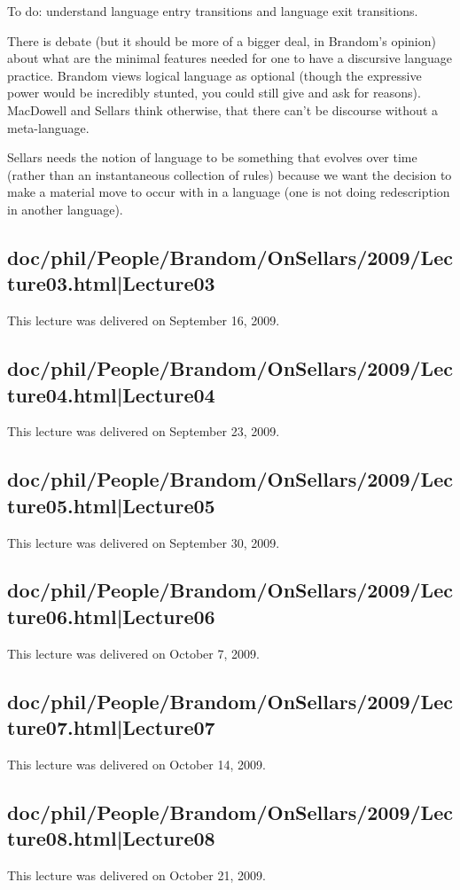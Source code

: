 \documentclass[12pt,a4paper]{report}
\begin{document}
To do: understand language entry transitions and language exit transitions.

There is debate (but it should be more of a bigger deal, in Brandom's opinion) about what are the minimal features needed for one to have a discursive language practice. Brandom views logical language as optional (though the expressive power would be incredibly stunted, you could still give and ask for reasons). MacDowell and Sellars think otherwise, that there can't be discourse without a meta-language.

Sellars needs the notion of language to be something that evolves over time (rather than an instantaneous collection of rules) because we want the decision to make a material move to occur with in a language (one is not doing redescription in another language).
\subsection{doc/phil/People/Brandom/OnSellars/2009/Lecture03.html|Lecture03}
This lecture was delivered on September 16, 2009.

\subsection{doc/phil/People/Brandom/OnSellars/2009/Lecture04.html|Lecture04}
This lecture was delivered on September 23, 2009.

\subsection{doc/phil/People/Brandom/OnSellars/2009/Lecture05.html|Lecture05}
This lecture was delivered on September 30, 2009.

\subsection{doc/phil/People/Brandom/OnSellars/2009/Lecture06.html|Lecture06}
This lecture was delivered on October 7, 2009.

\subsection{doc/phil/People/Brandom/OnSellars/2009/Lecture07.html|Lecture07}
This lecture was delivered on October 14, 2009.

\subsection{doc/phil/People/Brandom/OnSellars/2009/Lecture08.html|Lecture08}
This lecture was delivered on October 21, 2009.
\end{document}
